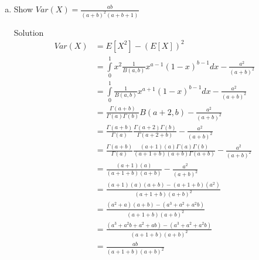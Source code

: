 \documentclass{article}
\begin{document}
\begin{spacing}{1.1}
\begin{homeworkProblem}
\begin{enumerate}[(a)]
\begin{homeworkSection}{Solution}
\begin{align*}
            \frac{ \Gamma( a + 1) \Gamma( b)}{ \Gamma( a + 1 + b)} \\
          &= \frac{ \Gamma( a + b)}{ \Gamma( a)} 
            \frac{ \Gamma( a + 1)}{ \Gamma( a + 1 + b)} \\
          &= \frac{ \Gamma( a + b)}{ \Gamma( a)} 
            \frac{ a\Gamma( a)}{ (a + b)\Gamma( a + b)} \\
          &= \frac{ a}{ (a + b)} \\
        \end{align*}
      \end{homeworkSection}
    \item Show $Var( X) = \frac{ ab}{ (a + b)^2 (a + b + 1)}$
      \begin{homeworkSection}{Solution}
        \begin{align*}
          Var( X) &= E[ X^2] - (E[ X])^2\\
          &= \int\limits_0^1 x^2 \frac{ 1}{ B(a, b)} x^{a - 1} (1 - x)^{b - 1} dx 
            - \frac{ a^2}{ (a + b)^2}\\
          &= \int\limits_0^1 \frac{ 1}{ B(a, b)} x^{a + 1} (1 - x)^{b - 1} dx 
            - \frac{ a^2}{ (a + b)^2}\\
          &= \frac{ \Gamma( a + b)}{ \Gamma( a) \Gamma( b)} B(a + 2, b)
            - \frac{ a^2}{ (a + b)^2}\\
          &= \frac{ \Gamma( a + b)}{ \Gamma( a)}
            \frac{ \Gamma( a + 2) \Gamma( b)}{ \Gamma( a + 2 + b)}
            - \frac{ a^2}{ (a + b)^2}\\
          &= \frac{ \Gamma( a + b)}{ \Gamma( a) }
            \frac{ (a + 1) (a) \Gamma( a) \Gamma( b)}{ ( a + 1 + b)( a + b)\Gamma( a + b)}
            - \frac{ a^2}{ (a + b)^2}\\
          &= \frac{ (a + 1) (a)}{ ( a + 1 + b)( a + b)}
            - \frac{ a^2}{ (a + b)^2}\\
          &= \frac{ (a + 1) (a) (a + b) - ( a + 1 + b) (a^2)}{ ( a + 1 + b) ( a + b)^2}\\
          &= \frac{ (a^2 + a) (a + b) - ( a^3 + a^2 + a^2 b)}{ ( a + 1 + b) ( a + b)^2}\\
          &= \frac{ (a^3 + a^2 b + a^2 + a b) - ( a^3 + a^2 + a^2 b)}{ ( a + 1 + b) ( a + b)^2}\\
          &= \frac{ a b}{ ( a + 1 + b) ( a + b)^2}\\
        \end{align*}
      \end{homeworkSection}
  \end{enumerate}
\end{homeworkProblem}


\end{spacing}
\end{document}
